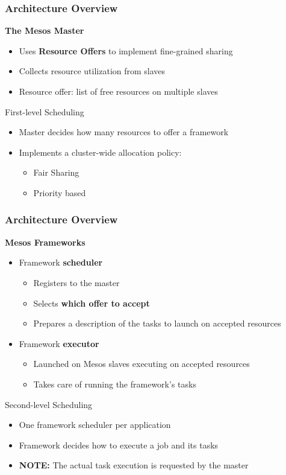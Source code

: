 \begin{frame}
\frametitle{Architecture Overview}
{\bf The Mesos Master}
\begin{itemize}
	\item Uses {\bf Resource Offers} to implement fine-grained sharing
	\item Collects resource utilization from slaves
	\item Resource offer: list of free resources on multiple slaves
\end{itemize}

\vspace{20pt}

\begin{block}{First-level Scheduling}
\begin{itemize}
	\item Master decides how many resources to offer a framework
	\item Implements a cluster-wide allocation policy:
	\begin{itemize}
		\item Fair Sharing
		\item Priority based
	\end{itemize}
\end{itemize}
\end{block}
\end{frame}

\begin{frame}
\frametitle{Architecture Overview}
{\bf Mesos Frameworks}
\begin{itemize}
	\item Framework {\bf scheduler}
	\begin{itemize}
		\item Registers to the master
		\item Selects {\bf which offer to accept}
		\item Prepares a description of the tasks to launch on accepted resources
	\end{itemize}	
	\item Framework {\bf executor}
	\begin{itemize}
		\item Launched on Mesos slaves executing on accepted resources
		\item Takes care of running the framework's tasks
	\end{itemize}
\end{itemize}
\begin{block}{Second-level Scheduling}
\begin{itemize}
	\item One framework scheduler per application
	\item Framework decides how to execute a job and its tasks
	\item {\bf NOTE:} The actual task execution is requested by the master
\end{itemize}
\end{block}
\end{frame}

